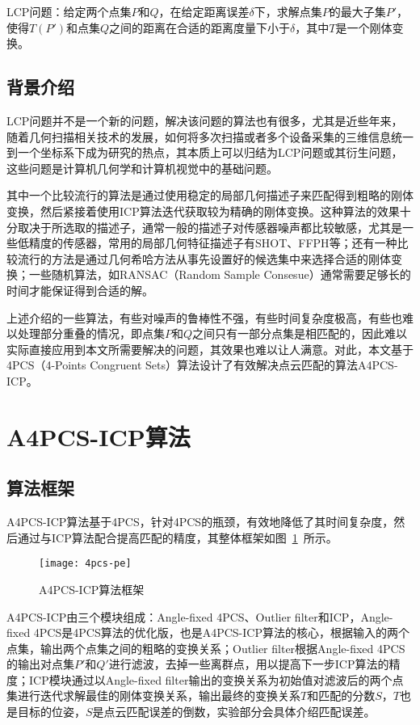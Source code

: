 {\kai LCP问题：给定两个点集$P$和$Q$，在给定距离误差$\delta$下，求解点集$P$的最大子集$P'$，使得$T(P')$和点集$Q$之间的距离在合适的距离度量下小于$\delta$，其中$T$是一个刚体变换。}

\subsection{背景介绍}
LCP问题并不是一个新的问题，解决该问题的算法也有很多，尤其是近些年来，随着几何扫描相关技术的发展，如何将多次扫描或者多个设备采集的三维信息统一到一个坐标系下成为研究的热点，其本质上可以归结为LCP问题或其衍生问题，这些问题是计算机几何学和计算机视觉中的基础问题。

其中一个比较流行的算法是通过使用稳定的局部几何描述子来匹配得到粗略的刚体变换，然后紧接着使用ICP算法迭代获取较为精确的刚体变换\cite{li2005multiscale}。这种算法的效果十分取决于所选取的描述子，通常一般的描述子对传感器噪声都比较敏感，尤其是一些低精度的传感器，常用的局部几何特征描述子有SHOT\cite{salti2014shot}、FFPH\cite{rusu2009fast}等；还有一种比较流行的方法是通过几何希哈方法从事先设置好的候选集中来选择合适的刚体变换\cite{wolfson1997geometric}；一些随机算法，如RANSAC（Random Sample Consesue）\cite{bolles1981ransac}通常需要足够长的时间才能保证得到合适的解。


上述介绍的一些算法，有些对噪声的鲁棒性不强，有些时间复杂度极高，有些也难以处理部分重叠的情况，即点集$P$和$Q$之间只有一部分点集是相匹配的，因此难以实际直接应用到本文所需要解决的问题，其效果也难以让人满意。对此，本文基于4PCS（4-Points Congruent Sets）算法设计了有效解决点云匹配的算法A4PCS-ICP。

\section{A4PCS-ICP算法}
\subsection{算法框架}
A4PCS-ICP算法基于4PCS，针对4PCS的瓶颈，有效地降低了其时间复杂度，然后通过与ICP算法配合提高匹配的精度，其整体框架如图~\ref{fig:4pcs-pe}~所示。
\begin{figure}[ht]
  \centering
  \texttt{[image: 4pcs-pe]}
  \caption{A4PCS-ICP算法框架}
  \label{fig:4pcs-pe}
\end{figure}
A4PCS-ICP由三个模块组成：Angle-fixed 4PCS、Outlier filter和ICP，Angle-fixed 4PCS是4PCS算法的优化版，也是A4PCS-ICP算法的核心，根据输入的两个点集，输出两个点集之间的粗略的变换关系；Outlier filter根据Angle-fixed 4PCS的输出对点集$P'$和$Q'$进行滤波，去掉一些离群点，用以提高下一步ICP算法的精度；ICP模块通过以Angle-fixed filter输出的变换关系为初始值对滤波后的两个点集进行迭代求解最佳的刚体变换关系，输出最终的变换关系$T$和匹配的分数$S$，$T$也是目标的位姿，$S$是点云匹配误差的倒数，实验部分会具体介绍匹配误差。

